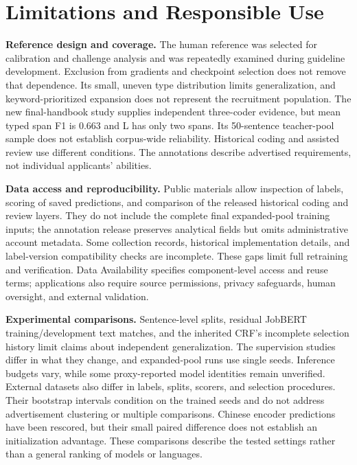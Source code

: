 \section{Limitations and Responsible Use}
\label{sec:limitations}

\textbf{Reference design and coverage.} The human reference was selected for calibration and challenge analysis and was repeatedly examined during guideline development. Exclusion from gradients and checkpoint selection does not remove that dependence. Its small, uneven type distribution limits generalization, and keyword-prioritized expansion does not represent the recruitment population. The new final-handbook study supplies independent three-coder evidence, but mean typed span F1 is 0.663 and L has only two spans. Its 50-sentence teacher-pool sample does not establish corpus-wide reliability. Historical coding and assisted review use different conditions. The annotations describe advertised requirements, not individual applicants' abilities.

\textbf{Data access and reproducibility.} Public materials allow inspection of labels, scoring of saved predictions, and comparison of the released historical coding and review layers. They do not include the complete final expanded-pool training inputs; the annotation release preserves analytical fields but omits administrative account metadata. Some collection records, historical implementation details, and label-version compatibility checks are incomplete. These gaps limit full retraining and verification. Data Availability specifies component-level access and reuse terms; applications also require source permissions, privacy safeguards, human oversight, and external validation.

\textbf{Experimental comparisons.} Sentence-level splits, residual JobBERT training/development text matches, and the inherited CRF's incomplete selection history limit claims about independent generalization. The supervision studies differ in what they change, and expanded-pool runs use single seeds. Inference budgets vary, while some proxy-reported model identities remain unverified. External datasets also differ in labels, splits, scorers, and selection procedures. Their bootstrap intervals condition on the trained seeds and do not address advertisement clustering or multiple comparisons. Chinese encoder predictions have been rescored, but their small paired difference does not establish an initialization advantage. These comparisons describe the tested settings rather than a general ranking of models or languages.

